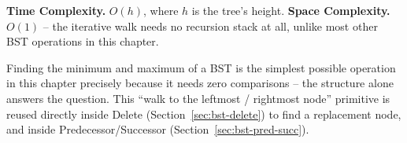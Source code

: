 \begin{complexitybox}
\textbf{Time Complexity.} $O(h)$, where $h$ is the tree's height.
\textbf{Space Complexity.} $O(1)$ -- the iterative walk needs no
recursion stack at all, unlike most other BST operations in this chapter.
\end{complexitybox}

\begin{takeawaybox}
Finding the minimum and maximum of a BST is the simplest possible
operation in this chapter precisely because it needs zero comparisons --
the structure alone answers the question. This ``walk to the leftmost /
rightmost node'' primitive is reused directly inside Delete
(Section~\ref{sec:bst-delete}) to find a replacement node, and inside
Predecessor/Successor (Section~\ref{sec:bst-pred-succ}).
\end{takeawaybox}
